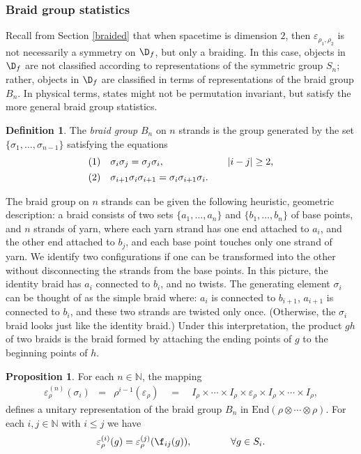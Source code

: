 \documentclass[12pt]{article}
\newcommand{\abs}[1]{|#1|}
\theoremstyle{definition}
\newtheorem{prop}[thm]{Proposition}
\theoremstyle{definition}
\newtheorem{defn}[thm]{Definition}
\theoremstyle{remark}
\newcommand{\ve}{\varepsilon}
\def\7#1{{\mathbb #1}}
\begin{document}
\subsubsection{Braid group statistics}

Recall from Section \ref{braided} that when spacetime
is dimension $2$, then $\ve _{\rho _1,\rho _2}$ is not
necessarily a symmetry on $\D _f$, but only a braiding.
In this case, objects in $\D _f$ are not classified
according to representations of the symmetric group
$S_n$; rather, objects in $\D _f$ are classified in
terms of representations of the braid group $B_n$.  In
physical terms, states might not be permutation
invariant, but satisfy the more general braid group
statistics.

\begin{defn} The \emph{braid group} $B_n$ on $n$
  strands is the group generated by the set $\{ \sigma
  _1,\dots ,\sigma _{n-1} \}$ satisfying the equations
  \[ \begin{array}{llll} (1) & \sigma _i\sigma _j =\sigma _j\sigma _i
    , & &
    \abs{i-j}\geq 2 ,\vspace{4pt} \\
    (2) & \sigma _{i+1}\sigma _i\sigma _{i+1} =\sigma _i\sigma
    _{i+1}\sigma _i .\end{array} \]
\end{defn}
The braid group on $n$ strands can be given the
following heuristic, geometric description: a braid
consists of two sets $\{ a_1,\dots ,a_n\}$ and $\{
b_1,\dots ,b_n\}$ of base points, and $n$ strands of
yarn, where each yarn strand has one end attached to
$a_i$, and the other end attached to $b_j$, and each
base point touches only one strand of yarn.  We
identify two configurations if one can be transformed
into the other without disconnecting the strands from
the base points.  In this picture, the identity braid
has $a_i$ connected to $b_i$, and no twists.  The
generating element $\sigma _i$ can be thought of as the
simple braid where: $a_i$ is connected to $b_{i+1}$,
$a_{i+1}$ is connected to $b_i$, and these two strands
are twisted only once.  (Otherwise, the $\sigma _i$
braid looks just like the identity braid.)  Under this
interpretation, the product $gh$ of two braids is the
braid formed by attaching the ending points of $g$ to
the beginning points of $h$.

\begin{prop} For each $n\in \7N$, the mapping
  \begin{eqnarray*} \ve ^{(n)}_{\rho}(\sigma _i) & = &
    \rho ^{i-1}(\ve _\rho) \quad =\quad I_\rho \times
    \cdots \times I_\rho \times \ve _{\rho} \times
    I_\rho \times \cdots \times
    I_{\rho},\end{eqnarray*} defines a unitary
  representation of the braid group $B_n$ in
  $\mathrm{End}\left( \rho \otimes \cdots \otimes \rho
  \right)$.  For each $i,j\in \7N$ with $i\leq j$ we
  have
$$ \ve ^{(i)}_{\rho}(g) =\ve ^{(j)}_{\rho}(\f _{ij}(g)) ,\qquad \qquad \forall g\in
S_i .$$ \label{thm-braid}
\end{prop}
\end{document}
